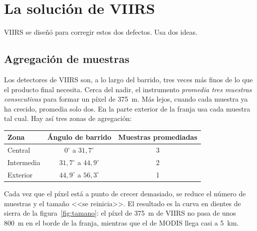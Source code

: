 \section{La solución de VIIRS}

VIIRS se diseñó para corregir estos dos defectos. Usa dos ideas.

\subsection{Agregación de muestras}

Los detectores de VIIRS son, a lo largo del barrido, tres veces más finos de lo que el producto
final necesita. Cerca del nadir, el instrumento \emph{promedia tres muestras consecutivas} para
formar un píxel de 375~m. Más lejos, cuando cada muestra ya ha crecido, promedia solo dos. En la
parte exterior de la franja usa cada muestra tal cual. Hay así tres zonas de agregación:

\begin{center}
\begin{tabular}{lcc}
\toprule
Zona & Ángulo de barrido & Muestras promediadas \\
\midrule
Central & $0^\circ$ a $31{,}7^\circ$ & 3 \\
Intermedia & $31{,}7^\circ$ a $44{,}9^\circ$ & 2 \\
Exterior & $44{,}9^\circ$ a $56{,}3^\circ$ & 1 \\
\bottomrule
\end{tabular}
\end{center}

Cada vez que el píxel está a punto de crecer demasiado, se reduce el número de muestras y el
tamaño <<se reinicia>>. El resultado es la curva en dientes de sierra de la
figura~\ref{fig:tamano}: el píxel de 375~m de VIIRS no pasa de unos 800~m en el borde de la
franja, mientras que el de MODIS llega casi a 5~km.

